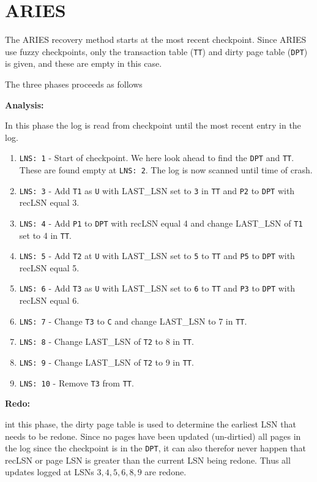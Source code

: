 
\section{ARIES}

The ARIES recovery method starts at the most recent checkpoint. Since ARIES
use fuzzy checkpoints, only the transaction table ({\tt TT}) and dirty page
table ({\tt DPT}) is given, and these are empty in this case.

\noindent
The three phases proceeds as follows

\noindent
{\bf Analysis:}

In this phase the log is read from checkpoint until the most recent entry in
the log.
\begin{enumerate}
\item {\tt LNS: 1} - Start of checkpoint. We here look ahead to find the
{\tt DPT} and {\tt TT}. These are found empty at {\tt LNS: 2}. The log is now
scanned until time of crash.
\item {\tt LNS: 3} - Add {\tt T1} as {\tt U} with LAST\_LSN set to {\tt 3} in {\tt TT} and {\tt P2} to {\tt DPT} with recLSN equal 3.
\item {\tt LNS: 4} - Add {\tt P1} to {\tt DPT} with recLSN equal 4 and change LAST\_LSN of
    {\tt T1} set to 4 in {\tt TT}.
\item {\tt LNS: 5} - Add {\tt T2} at {\tt U} with LAST\_LSN set to {\tt 5}
    to {\tt TT} and {\tt P5} to {\tt DPT} with recLSN equal 5.
\item {\tt LNS: 6} - Add {\tt T3} as {\tt U} with LAST\_LSN set to {\tt 6}
    to {\tt TT} and {\tt P3} to {\tt DPT}  with recLSN equal 6.
\item {\tt LNS: 7} - Change {\tt T3} to {\tt C} and change LAST\_LSN to 7 in {\tt TT}.
\item {\tt LNS: 8} - Change LAST\_LSN of {\tt T2} to 8 in {\tt TT}.
\item {\tt LNS: 9} - Change LAST\_LSN of {\tt T2} to 9 in {\tt TT}.
\item {\tt LNS: 10} - Remove {\tt T3} from {\tt TT}.
\end{enumerate}

\noindent
{\bf Redo:}

int this phase, the dirty page table is used to determine the earliest LSN that needs to be redone. Since no pages have been updated (un-dirtied) all pages in the log since the checkpoint is in the {\tt DPT}, it can also therefor never happen that recLSN or page LSN is greater than the current LSN being redone. Thus all updates logged at LSNs $3,4,5,6,8,9$ are redone.

